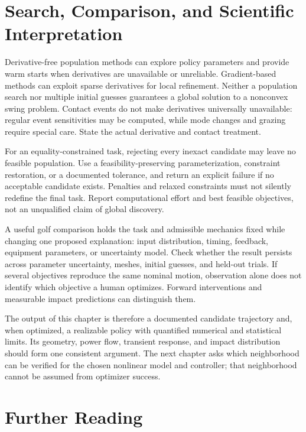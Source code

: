 \documentclass[12pt, openany]{book}
\theoremstyle{plain}
\begin{document}
\section{Search, Comparison, and Scientific Interpretation}

Derivative-free population methods can explore policy parameters and provide
warm starts when derivatives are unavailable or unreliable. Gradient-based
methods can exploit sparse derivatives for local refinement. Neither a
population search nor multiple initial guesses guarantees a global solution
to a nonconvex swing problem. Contact events do not make derivatives
universally unavailable: regular event sensitivities may be computed, while
mode changes and grazing require special care. State the actual derivative
and contact treatment.

For an equality-constrained task, rejecting every inexact candidate may leave
no feasible population. Use a feasibility-preserving parameterization,
constraint restoration, or a documented tolerance, and return an explicit
failure if no acceptable candidate exists. Penalties and relaxed constraints
must not silently redefine the final task. Report computational effort and
best feasible objectives, not an unqualified claim of global discovery.

A useful golf comparison holds the task and admissible mechanics fixed while
changing one proposed explanation: input distribution, timing, feedback,
equipment parameters, or uncertainty model. Check whether the result
persists across parameter uncertainty, meshes, initial guesses, and held-out
trials. If several objectives reproduce the same nominal motion, observation
alone does not identify which objective a human optimizes. Forward
interventions and measurable impact predictions can distinguish them.

The output of this chapter is therefore a documented candidate trajectory
and, when optimized, a realizable policy with quantified numerical and
statistical limits. Its geometry, power flow, transient response, and impact
distribution should form one consistent argument. The next chapter asks
which neighborhood can be verified for the chosen nonlinear model and
controller; that neighborhood cannot be assumed from optimizer success.

\section{Further Reading}
\end{document}
